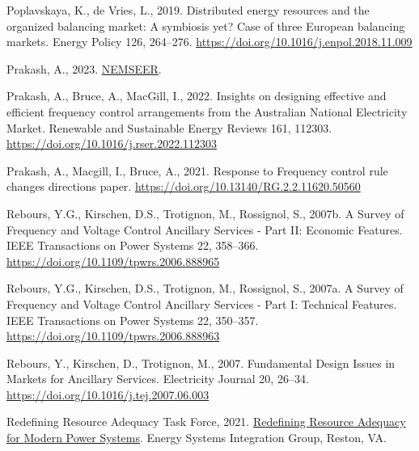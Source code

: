 \documentclass[12pt,a4paper,]{report}
\newlength{\cslhangindent}
\newenvironment{CSLReferences}[2] %
 {%
  \setlength{\parindent}{0pt}
  \ifodd #1 \everypar{\setlength{\hangindent}{\cslhangindent}}\ignorespaces\fi
  \ifnum #2 > 0
  \setlength{\parskip}{#2\baselineskip}
  \fi
 }%
 {}
\begin{document}
\begin{CSLReferences}{1}{0}
\leavevmode{}%
Poplavskaya, K., de Vries, L., 2019. Distributed energy resources and
the organized balancing market: {A} symbiosis yet? {Case} of three
{European} balancing markets. Energy Policy 126, 264--276.
\url{https://doi.org/10.1016/j.enpol.2018.11.009}

\leavevmode{}%
Prakash, A., 2023.
\href{https://doi.org/10.5281/zenodo.7397514}{{NEMSEER}}.

\leavevmode{}%
Prakash, A., Bruce, A., MacGill, I., 2022. Insights on designing
effective and efficient frequency control arrangements from the
{Australian National Electricity Market}. Renewable and Sustainable
Energy Reviews 161, 112303.
\url{https://doi.org/10.1016/j.rser.2022.112303}

\leavevmode{}%
Prakash, A., Macgill, I., Bruce, A., 2021. Response to {Frequency}
control rule changes directions paper.
\url{https://doi.org/10.13140/RG.2.2.11620.50560}

\leavevmode{}%
Rebours, Y.G., Kirschen, D.S., Trotignon, M., Rossignol, S., 2007b. A
{Survey} of {Frequency} and {Voltage Control Ancillary Services} - {Part
II}: {Economic Features}. IEEE Transactions on Power Systems 22,
358--366. \url{https://doi.org/10.1109/tpwrs.2006.888965}

\leavevmode{}%
Rebours, Y.G., Kirschen, D.S., Trotignon, M., Rossignol, S., 2007a. A
{Survey} of {Frequency} and {Voltage Control Ancillary Services} - {Part
I}: {Technical Features}. IEEE Transactions on Power Systems 22,
350--357. \url{https://doi.org/10.1109/tpwrs.2006.888963}

\leavevmode{}%
Rebours, Y., Kirschen, D., Trotignon, M., 2007. Fundamental {Design
Issues} in {Markets} for {Ancillary Services}. Electricity Journal 20,
26--34. \url{https://doi.org/10.1016/j.tej.2007.06.003}

\leavevmode{}%
Redefining Resource Adequacy Task Force, 2021.
\href{https://www.esig.energy/wp-content/uploads/2021/08/ESIG-Redefining-Resource-Adequacy-2021.pdf}{Redefining
{Resource Adequacy} for {Modern Power Systems}}. {Energy Systems
Integration Group}, {Reston, VA}.


\end{CSLReferences}
\end{document}
